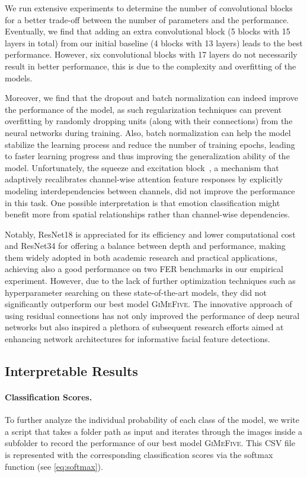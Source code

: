 We run extensive experiments to determine the number of convolutional blocks for a better trade-off between the number of parameters and the performance. 
Eventually, we find that adding an extra convolutional block 
(5 blocks with 15 layers in total) from our initial baseline (4 blocks with 13 layers)
leads to the best performance. 
However, six convolutional blocks with 17 layers do not necessarily result in better performance, 
this is due to the complexity and overfitting of the models. 

Moreover, 
we find that the dropout and batch normalization can indeed improve the performance of the model, 
as such regularization techniques can prevent overfitting by randomly dropping units 
(along with their connections) from the neural networks during training. 
Also, 
batch normalization can help the model stabilize the learning process and reduce the number of training epochs, 
leading to faster learning progress and thus improving the generalization ability of the model. 
Unfortunately, the squeeze and excitation block~\cite{HuSASW20}, 
a mechanism that adaptively recalibrates channel-wise attention feature responses by explicitly modeling interdependencies between channels, 
did not improve the performance in this task. 
One possible interpretation is that emotion classification might benefit more from spatial relationships rather than channel-wise dependencies. 

Notably, 
ResNet18 is appreciated for its efficiency and lower computational cost and ResNet34 for offering a balance between depth and performance, 
making them widely adopted in both academic research and practical applications, 
achieving also a good performance on two FER benchmarks in our empirical experiment. 
However, due to the lack of further optimization techniques such as hyperparameter searching on these state-of-the-art models, 
they did not significantly outperform our best model \textsc{GiMeFive}. 
The innovative approach of using residual connections has not only improved the performance of deep neural networks 
but also inspired a plethora of subsequent research efforts aimed at enhancing network architectures for informative facial feature detections.

\subsection{Interpretable Results}
\label{sec:evaluation:inter}

\paragraph{Classification Scores.} 
To further analyze the individual probability of each class of the model, 
we write a script that takes a folder path as input and iterates through the images inside a subfolder to record the performance of our best model \textsc{GiMeFive}. 
This CSV file is represented with the corresponding classification scores via the softmax function (see \cref{eq:softmax}). 

